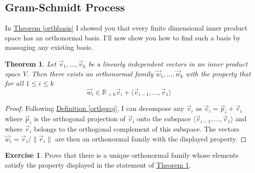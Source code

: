 \documentclass[11pt]{amsbook}
\newtheorem{theorem}{Theorem}[section]
\theoremstyle{definition}
\newtheorem{exercise}{Exercise}
\begin{document}
\subsection*{Gram-Schmidt Process} In \hyperref[orthbasis]{Theorem \ref{orthbasis}} I showed you that every finite dimensional inner product space has an orthonormal basis. I'll now show you how to find such a basis by massaging any existing basis.

\begin{theorem} \label{GS} Let $\vec{v}_1, \ldots , \vec{v}_k $ be a linearly independent vectors in an inner product space $V$. Then there exists an orthonormal family $\vec{w}_1, \ldots , \vec{w}_k$ with the property that for all $1\leqslant i \leqslant k$ $$\vec{w}_i \in \mathbb{R}_{>0} \vec{v}_i + \langle \vec{v}_{i-1}, \ldots , \vec{v}_1 \rangle$$
\end{theorem}
\begin{proof}
Following \hyperref[orthproj]{Definition \ref{orthproj}}, I can decompose any $\vec{v}_i$ as $\vec{v}_i = \vec{p}_i + \vec{r}_i$ where $\vec{p}_i$ is the orthogonal projection of $\vec{v}_i$ onto the subspace $\langle \vec{v}_{i-1}, \ldots , \vec{v}_1 \rangle$ and where $\vec{r}_i$ belongs to the orthogonal complement of this subspace. The vectors $\vec{w}_i = \vec{r}_i / \|\vec{r}_i\|$ are then an orthonormal family with the displayed property.
\end{proof}

\begin{exercise} Prove that there is a unique orthonormal family whose elements satisfy the property displayed in the statement of \hyperref[GS]{Theorem \ref{GS}}.
\end{exercise}
\end{document}
